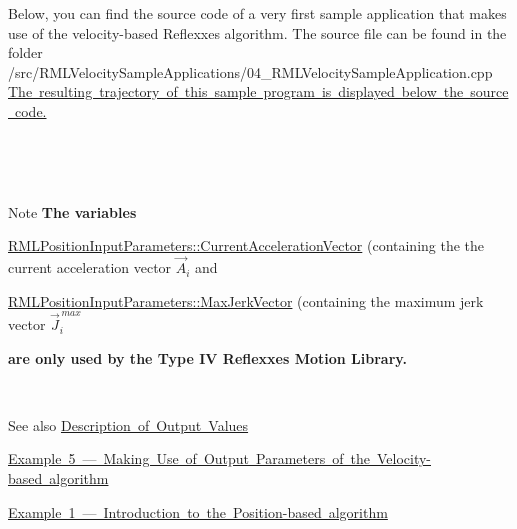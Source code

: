 Below, you can find the source code of a very first sample application that makes use of the velocity-\/based Reflexxes algorithm. The source file can be found in the folder~\newline
~\newline
{\ttfamily /src/\+R\+M\+L\+Velocity\+Sample\+Applications/04\+\_\+\+R\+M\+L\+Velocity\+Sample\+Application.cpp}~\newline
~\newline
\mbox{\hyperlink{page_Code_04_RMLVelocitySampleApplication_anc_VelocityExample4}{The resulting trajectory of this sample program is displayed below the source code.}} ~\newline
~\newline
 
\begin{DoxyCodeInclude}{0}
\end{DoxyCodeInclude}


~\newline
~\newline
\label{page_Code_04_RMLVelocitySampleApplication_anc_VelocityExample4}%
%
 

~\newline
 \begin{DoxyNote}{Note}
{\bfseries{The variables}}~\newline
~\newline

\begin{DoxyItemize}
\item \mbox{\hyperlink{classRMLInputParameters_a423bf4b1ef337cbf6eee22fe2e2502c1}{R\+M\+L\+Position\+Input\+Parameters\+::\+Current\+Acceleration\+Vector}} (containing the the current acceleration vector $ \vec{A}_i$ and~\newline
~\newline
 
\item \mbox{\hyperlink{classRMLInputParameters_a5968ce643868260410f149996c446b66}{R\+M\+L\+Position\+Input\+Parameters\+::\+Max\+Jerk\+Vector}} (containing the maximum jerk vector $ \vec{J}_i^{\,max} $ ~\newline
~\newline
 
\end{DoxyItemize}{\bfseries{are only used by the Type IV Reflexxes Motion Library.}}
\end{DoxyNote}
~\newline
~\newline
 \begin{DoxySeeAlso}{See also}
\mbox{\hyperlink{page_OutputValues}{Description of Output Values}} 

\mbox{\hyperlink{page_Code_05_RMLVelocitySampleApplication}{Example 5 --- Making Use of Output Parameters of the Velocity-\/based algorithm}} 

\mbox{\hyperlink{page_Code_01_RMLPositionSampleApplication}{Example 1 --- Introduction to the Position-\/based algorithm}} 
\end{DoxySeeAlso}
